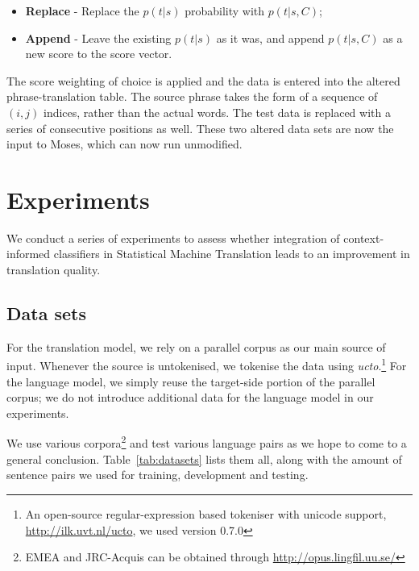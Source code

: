 \begin{itemize}
  \item \textbf{Replace} - Replace the $p(t|s)$ probability with $p(t|s,C)$;
  \item \textbf{Append} - Leave the existing $p(t|s)$ as it was, and append
    $p(t|s,C)$ as a new score to the score vector.
\end{itemize}

The score weighting of choice is applied and the data is entered into the
altered phrase-translation table. The source phrase takes the form of a
sequence of $(i,j)$ indices, rather than the actual words. The test data is
replaced with a series of consecutive positions as well. These two altered data
sets are now the input to Moses, which can now run unmodified. 

\section{Experiments}
\label{sec:experiments}

We conduct a series of experiments to assess whether integration of
context-informed classifiers in Statistical Machine Translation leads to
an improvement in translation quality. 


\subsection{Data sets}

For the translation model, we rely on a parallel corpus as our main source of
input. Whenever the source is untokenised, we tokenise the data using
\emph{ucto}.\footnote{An open-source regular-expression based tokeniser with
unicode support, \url{http://ilk.uvt.nl/ucto}, we used version 0.7.0} For the language model, we
simply reuse the target-side portion of the parallel corpus; we do not
introduce additional data for the language model in our experiments.

We use various corpora\footnote{EMEA and JRC-Acquis can be obtained through
\url{http://opus.lingfil.uu.se/}} and test various language pairs as we hope to
come to a general conclusion. Table~\ref{tab:datasets} lists them all, along with the amount of
sentence pairs we used for training, development and testing.

